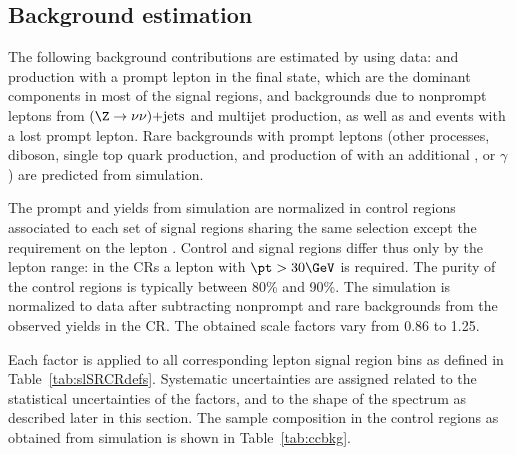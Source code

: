 \subsection{Background estimation}\label{sec:singleleptonBkg}

The following background contributions are estimated by using data: 
\Wjets and \ttbar production with a prompt lepton in the final state, which are the dominant components in most of the signal regions,
and backgrounds due to nonprompt leptons from
$(\Z \to \nu\nu) \mathrm{+jets}$ and multijet production, as well as \Wjets and \ttbar events with a lost prompt lepton.
Rare backgrounds with prompt leptons (other \Zg processes, diboson, single top quark production, 
and production of \ttbar with an additional \W, \Z or $\gamma$ ) are predicted from simulation.

The prompt \Wjets and \ttbar yields from simulation are normalized in control regions associated to each set of signal regions
sharing the same selection except the requirement on the lepton \pt.
Control and signal regions differ thus only by the lepton \pt range: in the CRs a lepton with $\pt>30\GeV$ is required.
The purity of the control regions is typically between 80\% and 90\%.
The simulation is normalized to data after subtracting nonprompt and rare backgrounds from the observed yields in the CR.
The obtained scale factors vary from 0.86 to 1.25.

Each factor is applied to all corresponding lepton \pt signal region bins as defined in Table~\ref{tab:slSRCRdefs}.
Systematic uncertainties are assigned related to the statistical uncertainties of the factors, and to the shape of the \pt spectrum as described later in this section.
The sample composition in the control regions as obtained from simulation is shown in Table~\ref{tab:ccbkg}.

